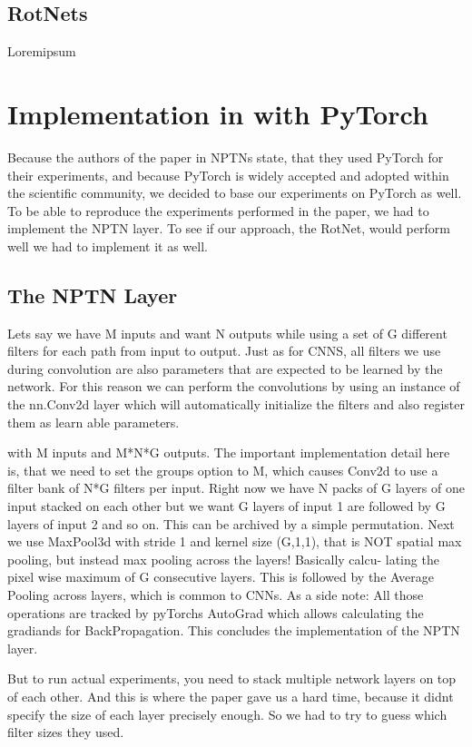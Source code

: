 \documentclass{llncs}
\begin{document}
\subsection{RotNets}
Loremipsum

\section{Implementation in with PyTorch}
Because the authors of the paper in NPTNs state, that they used PyTorch for their experiments, and because PyTorch is widely accepted and adopted within the scientific community, we decided to base our experiments on PyTorch as well.
To be able to reproduce the experiments performed in the paper, we had to implement the NPTN layer. To see if our approach, the RotNet, would perform well we had to implement it as well.
\subsection{The NPTN Layer}
Lets say we have M inputs and want N outputs while using a set of G different filters for each path from input to output.
Just as for CNNS, all filters we use during convolution are also parameters that are expected to be learned by the network.
For this reason we can perform the convolutions by using an instance of the nn.Conv2d layer which will automatically initialize the filters and also register them as learn able parameters.

with M inputs and M*N*G outputs. The important implementation detail here is, that
we need to set the groups option to M, which causes Conv2d to use a filter bank
of N*G filters per input.
Right now we have N packs of G layers of one input stacked on each other
but we want G layers of input 1 are followed by G layers of input 2 and so on.
This can be archived by a simple permutation.
Next we use MaxPool3d with stride 1 and kernel size (G,1,1), that is NOT
spatial max pooling, but instead max pooling across the layers! Basically calcu-
lating the pixel wise maximum of G consecutive layers.
This is followed by the Average Pooling across layers, which is common to
CNNs.
As a side note: All those operations are tracked by pyTorchs AutoGrad which
allows calculating the gradiands for BackPropagation.
This concludes the implementation of the NPTN layer.

But to run actual experiments, you need to stack multiple network layers on
top of each other. And this is where the paper gave us a hard time, because it
didnt specify the size of each layer precisely enough. So we had to try to guess
which filter sizes they used.
\end{document}

